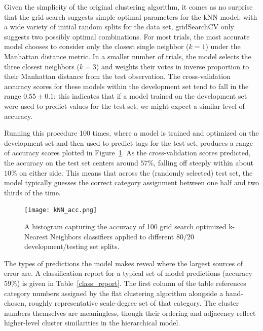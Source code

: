 Given the simplicity of the original clustering algorithm, it comes as no surprise that the grid search suggests simple optimal parameters for the kNN model: with a wide variety of initial random splits for the data set, gridSearchCV only suggests two possibly optimal combinations.  For most trials, the most accurate model chooses to consider only the closest single neighbor ($k=1$) under the Manhattan distance metric.  In a smaller number of trials, the model selects the three closest neighbors ($k=3$) and weights their votes in inverse proportion to their Manhattan distance from the test observation.  The cross-validation accuracy scores for these models within the development set tend to fall in the range $0.55 \pm 0.1$; this indicates that if a model trained on the development set were used to predict values for the test set, we might expect a similar level of accuracy.

Running this procedure 100 times, where a model is trained and optimized on the development set and then used to predict tags for the test set, produces a range of accuracy scores plotted in Figure~\ref{kNN}.  As the cross-validation scores predicted, the accuracy on the test set centers around $57\%$, falling off steeply within about $10\%$ on either side.  This means that across the (randomly selected) test set, the model typically guesses the correct category assignment between one half and two thirds of the time.

\begin{figure}
	\centering
	\caption{A histogram capturing the accuracy of 100 grid search optimized k-Nearest Neighbors classifiers applied to different 80/20 development/testing set splits.}
	\texttt{[image: kNN\_acc.png]}
	\label{kNN}
\end{figure}

The types of predictions the model makes reveal where the largest sources of error are.  A classification report for a typical set of model predictions (accuracy $59\%$) is given in Table~\ref{class_report}.  The first column of the table references category numbers assigned by the flat clustering algorithm alongside a hand-chosen, roughly representative scale-degree set of that category.  The cluster numbers themselves are meaningless, though their ordering and adjacency reflect higher-level cluster similarities in the hierarchical model.

